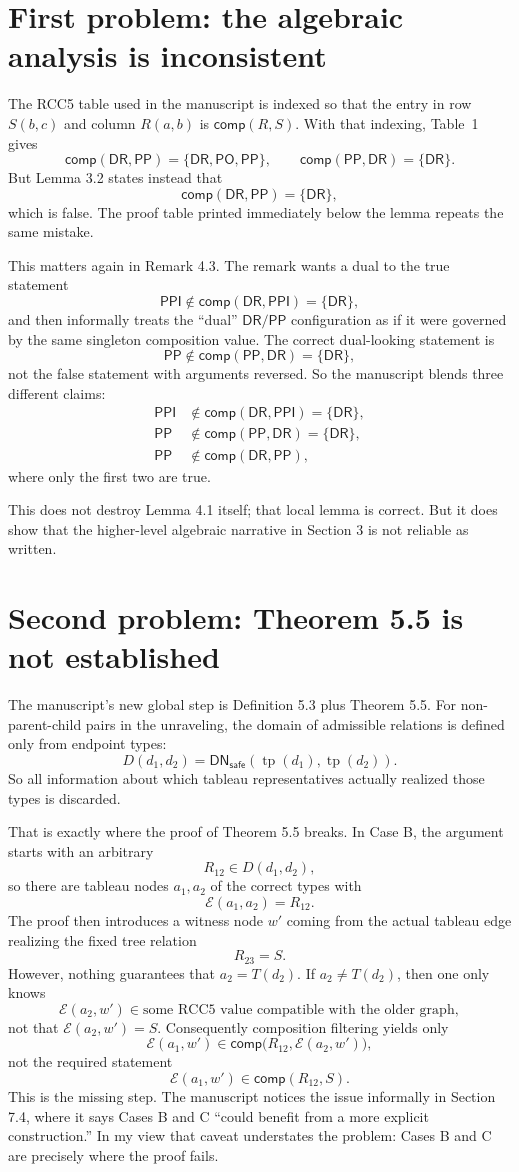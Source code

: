 \documentclass[11pt]{article}
\newcommand{\DR}{\mathsf{DR}}
\newcommand{\PO}{\mathsf{PO}}
\newcommand{\PP}{\mathsf{PP}}
\newcommand{\PPI}{\mathsf{PPI}}
\newcommand{\comp}{\mathsf{comp}}
\newcommand{\Elab}{\mathcal{E}}
\newcommand{\DNsafe}{\mathsf{DN}_{\mathsf{safe}}}
\begin{document}
\section{First problem: the algebraic analysis is inconsistent}

The RCC5 table used in the manuscript is indexed so that the entry in row $S(b,c)$ and column $R(a,b)$ is $\comp(R,S)$. With that indexing, Table~1 gives
\[
\comp(\DR,\PP)=\{\DR,\PO,\PP\},
\qquad
\comp(\PP,\DR)=\{\DR\}.
\]
But Lemma 3.2 states instead that
\[
\comp(\DR,\PP)=\{\DR\},
\]
which is false. The proof table printed immediately below the lemma repeats the same mistake.

This matters again in Remark 4.3. The remark wants a dual to the true statement
\[
\PPI \notin \comp(\DR,\PPI)=\{\DR\},
\]
and then informally treats the ``dual'' $\DR/\PP$ configuration as if it were governed by the same singleton composition value. The correct dual-looking statement is
\[
\PP \notin \comp(\PP,\DR)=\{\DR\},
\]
not the false statement with arguments reversed. So the manuscript blends three different claims:
\begin{align*}
\PPI &\notin \comp(\DR,\PPI)=\{\DR\}, \\
\PP &\notin \comp(\PP,\DR)=\{\DR\}, \\
\PP &\notin \comp(\DR,\PP),
\end{align*}
where only the first two are true.

This does not destroy Lemma 4.1 itself; that local lemma is correct. But it does show that the higher-level algebraic narrative in Section 3 is not reliable as written.

\section{Second problem: Theorem 5.5 is not established}

The manuscript's new global step is Definition 5.3 plus Theorem 5.5. For non-parent-child pairs in the unraveling, the domain of admissible relations is defined only from endpoint types:
\[
D(d_1,d_2)=\DNsafe(\operatorname{tp}(d_1),\operatorname{tp}(d_2)).
\]
So all information about which tableau representatives actually realized those types is discarded.

That is exactly where the proof of Theorem 5.5 breaks. In Case B, the argument starts with an arbitrary
\[
R_{12}\in D(d_1,d_2),
\]
so there are tableau nodes $a_1,a_2$ of the correct types with
\[
\Elab(a_1,a_2)=R_{12}.
\]
The proof then introduces a witness node $w'$ coming from the actual tableau edge realizing the fixed tree relation
\[
R_{23}=S.
\]
However, nothing guarantees that $a_2=T(d_2)$. If $a_2\neq T(d_2)$, then one only knows
\[
\Elab(a_2,w')\in \text{some RCC5 value compatible with the older graph},
\]
not that $\Elab(a_2,w')=S$. Consequently composition filtering yields only
\[
\Elab(a_1,w')\in \comp\bigl(R_{12},\Elab(a_2,w')\bigr),
\]
not the required statement
\[
\Elab(a_1,w')\in \comp(R_{12},S).
\]
This is the missing step. The manuscript notices the issue informally in Section 7.4, where it says Cases B and C ``could benefit from a more explicit construction.'' In my view that caveat understates the problem: Cases B and C are precisely where the proof fails.
\end{document}
